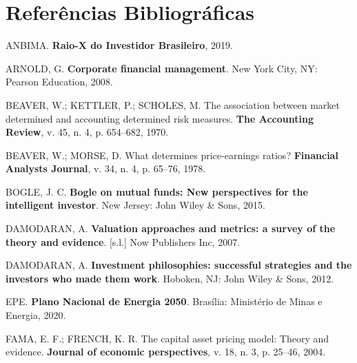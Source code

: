 \documentclass[grad,numbers]{coppe}
\newenvironment{cslreferences}%
  {}%
  {\par}
\begin{document}
  \backmatter

  \hypertarget{referuxeancias-bibliogruxe1ficas}{%
  \chapter*{Referências Bibliográficas}\label{referuxeancias-bibliogruxe1ficas}}


  \label{bib:begin}
  \noindent

  \setlength{\parindent}{-0.20in}
  \setlength{\leftskip}{0.20in}
  \setlength{\parskip}{8pt}

  \hypertarget{refs}{}
  \begin{cslreferences}
  \leavevmode\hypertarget{ref-anbima2019}{}%
  ANBIMA. \textbf{Raio-X do Investidor Brasileiro}, 2019.

  \leavevmode\hypertarget{ref-arnold2008}{}%
  ARNOLD, G. \textbf{Corporate financial management}. New York City, NY: Pearson Education, 2008.

  \leavevmode\hypertarget{ref-beaver1970}{}%
  BEAVER, W.; KETTLER, P.; SCHOLES, M. The association between market determined and accounting determined risk measures. \textbf{The Accounting Review}, v. 45, n. 4, p. 654--682, 1970.

  \leavevmode\hypertarget{ref-beaver1978}{}%
  BEAVER, W.; MORSE, D. What determines price-earnings ratios? \textbf{Financial Analysts Journal}, v. 34, n. 4, p. 65--76, 1978.

  \leavevmode\hypertarget{ref-bogle2015}{}%
  BOGLE, J. C. \textbf{Bogle on mutual funds: New perspectives for the intelligent investor}. New Jersey: John Wiley \& Sons, 2015.

  \leavevmode\hypertarget{ref-damodaran2007}{}%
  DAMODARAN, A. \textbf{Valuation approaches and metrics: a survey of the theory and evidence}. {[}s.l.{]} Now Publishers Inc, 2007.

  \leavevmode\hypertarget{ref-damodaran2012}{}%
  DAMODARAN, A. \textbf{Investment philosophies: successful strategies and the investors who made them work}. Hoboken, NJ: John Wiley \& Sons, 2012.

  \leavevmode\hypertarget{ref-epe2020}{}%
  EPE. \textbf{Plano Nacional de Energia 2050}. Brasília: Ministério de Minas e Energia, 2020.

  \leavevmode\hypertarget{ref-fama2004}{}%
  FAMA, E. F.; FRENCH, K. R. The capital asset pricing model: Theory and evidence. \textbf{Journal of economic perspectives}, v. 18, n. 3, p. 25--46, 2004.


\end{cslreferences}
\end{document}
